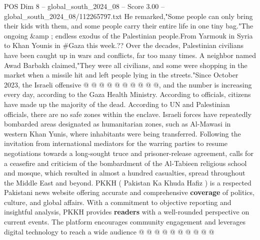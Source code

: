 \begin{textsample}{POS Dim 8 – global\_south\_2024\_08 – Score 3.00 – global\_south\_2024\_08/112265797.txt}
He remarked,"Some people can only bring their kids with them, and some people carry their entire life in one tiny bag."The ongoing \&amp ; endless exodus of the Palestinian people.From Yarmouk in Syria to Khan Younis in \#Gaza this week.??
Over the decades, Palestinian civilians have been caught up in wars and conflicts, far too many times.
A neighbor named Awad Barbakh claimed,"They were all civilians, and some were shopping in the market when a missile hit and left people lying in the streets."Since October 2023, the Israeli offensive @ @ @ @ @ @ @ @ @ @, and the number is increasing every day, according to the Gaza Health Ministry.
According to officials, citizens have made up the majority of the dead.
According to UN and Palestinian officials, there are no safe zones within the enclave.
Israeli forces have repeatedly bombarded areas designated as humanitarian zones, such as Al-Mawasi in western Khan Yunis, where inhabitants were being transferred.
Following the invitation from international mediators for the warring parties to resume negotiations towards a long-sought truce and prisoner-release agreement, calls for a ceasefire and criticism of the bombardment of the Al-Tabieen religious school and mosque, which resulted in almost a hundred casualties, spread throughout the Middle East and beyond.
PKKH ( Pakistan Ka Khuda Hafiz ) is a respected Pakistani news website offering accurate and comprehensive \textbf{coverage} of politics, culture, and global affairs.
With a commitment to objective reporting and insightful analysis, PKKH provides \textbf{readers} with a well-rounded perspective on current events.
The platform encourages community engagement and leverages digital technology to reach a wide audience @ @ @ @ @ @ @ @ @ @

\end{textsample}
